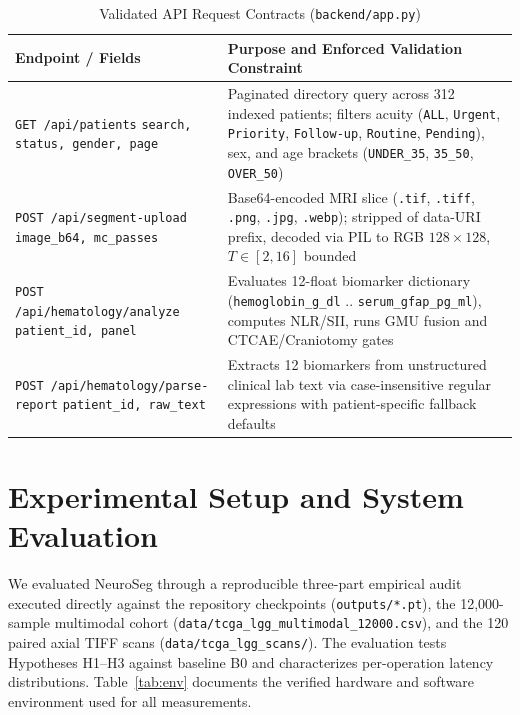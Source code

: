 \documentclass[journal,onecolumn,10pt]{IEEEtran}
\begin{document}
\begin{table}[t]
\centering
\caption{Validated API Request Contracts (\texttt{backend/app.py})}
\label{tab:contracts}
\begin{tabular}{@{}L{2.25cm}L{5.95cm}@{}}
\toprule
\textbf{Endpoint / Fields} & \textbf{Purpose and Enforced Validation Constraint} \\
\midrule
\texttt{GET /api/patients} \newline \texttt{search, status, gender, page} & Paginated directory query across 312 indexed patients; filters acuity (\texttt{ALL}, \texttt{Urgent}, \texttt{Priority}, \texttt{Follow-up}, \texttt{Routine}, \texttt{Pending}), sex, and age brackets (\texttt{UNDER\_35}, \texttt{35\_50}, \texttt{OVER\_50}) \\
\texttt{POST /api/segment-upload} \newline \texttt{image\_b64, mc\_passes} & Base64-encoded MRI slice (\texttt{.tif}, \texttt{.tiff}, \texttt{.png}, \texttt{.jpg}, \texttt{.webp}); stripped of data-URI prefix, decoded via PIL to RGB $128\times 128$, $T \in [2, 16]$ bounded \\
\texttt{POST /api/hematology}\newline\texttt{/analyze} \newline \texttt{patient\_id, panel} & Evaluates 12-float biomarker dictionary (\texttt{hemoglobin\_g\_dl} .. \texttt{serum\_gfap\_pg\_ml}), computes NLR/SII, runs GMU fusion and CTCAE/Craniotomy gates \\
\texttt{POST /api/hematology}\newline\texttt{/parse-report} \newline \texttt{patient\_id, raw\_text} & Extracts 12 biomarkers from unstructured clinical lab text via case-insensitive regular expressions with patient-specific fallback defaults \\
\bottomrule
\end{tabular}
\end{table}

\section{Experimental Setup and System Evaluation}
We evaluated NeuroSeg through a reproducible three-part empirical audit executed directly against the repository checkpoints (\texttt{outputs/*.pt}), the 12,000-sample multimodal cohort (\texttt{data/tcga\_lgg\_multimodal\_12000.csv}), and the 120 paired axial TIFF scans (\texttt{data/tcga\_lgg\_scans/}). The evaluation tests Hypotheses H1--H3 against baseline B0 and characterizes per-operation latency distributions. Table~\ref{tab:env} documents the verified hardware and software environment used for all measurements.
\end{document}
